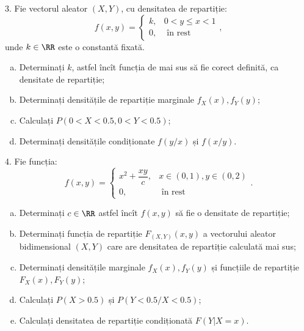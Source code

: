 \vspace{0.3cm}

3. Fie vectorul aleator $ (X, Y) $, cu densitatea de repartiție:
\[
  f(x, y) = \begin{cases}
    k, & 0 < y \leq x < 1 \\
    0, & \text{ în rest}
  \end{cases},
\]
unde $ k \in \RR $ este o constantă fixată.
\begin{enumerate}[(a)]
\item Determinați $ k $, astfel încît funcția de mai sus să fie corect
  definită, ca densitate de repartiție;
\item Determinați densitățile de repartiție marginale $ f_X(x), f_Y(y) $;
\item Calculați $ P(0 < X < 0.5, 0 < Y < 0.5) $;
\item Determinați densitățile condiționate $ f(y/x) $ și $ f(x/y) $.
\end{enumerate}

\vspace{0.3cm}

4. Fie funcția:
\[
  f(x, y) = \begin{cases}
    x^2 + \dfrac{xy}{c}, & x \in (0, 1), y \in (0,2) \\
    0, & \text{ în rest}
  \end{cases}.
\]
\begin{enumerate}[(a)]
\item Determinați $ c \in \RR $ astfel încît $ f(x, y) $ să fie o densitate
  de repartiție;
\item Determinați funcția de repartiție $ F_{(X,Y)}(x, y) $ a vectorului aleator
  bidimensional $ (X, Y) $ care are densitatea de repartiție calculată mai sus;
\item Determinați densitățile marginale $ f_X(x), f_Y(y) $ și funcțiile de
  repartiție $ F_X(x), F_Y(y) $;
\item Calculați $ P(X > 0.5) $ și $ P(Y < 0.5 / X < 0.5) $;
\item Calculați densitatea de repartiție condiționată $ F(Y | X = x) $.
\end{enumerate}

\vspace{0.3cm}

